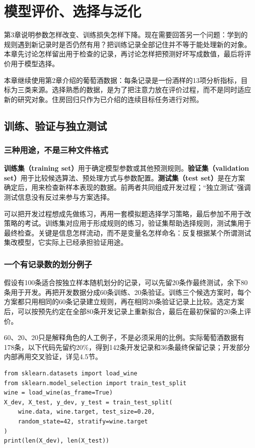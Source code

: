 \chapter{模型评价、选择与泛化}
\label{chap:evaluation}

第3章说明参数怎样改变、训练损失怎样下降。现在需要回答另一个问题：学到的规则遇到新记录时是否仍然有用？把训练记录全部记住并不等于能处理新的对象。本章先讨论怎样留出用于检查的记录，再讨论怎样把预测好坏写成数值，最后将评价用于模型选择。

本章继续使用第2章介绍的葡萄酒数据：每条记录是一份酒样的13项分析指标，目标为三类来源。选择熟悉的数据，是为了把注意力放在评价过程，而不是同时适应新的研究对象。住房回归只作为已介绍的连续目标任务进行对照。

\section{训练、验证与独立测试}
\subsection{三种用途，不是三种文件格式}
\textbf{训练集（training set）}用于确定模型参数或其他预测规则。\textbf{验证集（validation set）}用于比较候选算法、预处理方式与参数配置。\textbf{测试集（test set）}是在方案确定后，用来检查新样本表现的数据。前两者共同组成开发过程；“独立测试”强调测试信息没有反过来参与方案选择。

可以把开发过程想成先做练习，再用一套模拟题选择学习策略，最后参加不用于改策略的考试。训练集对应用于形成规则的练习，验证集帮助选择规则，测试集用于最终检查。关键是信息怎样流动，而不是变量名怎样命名：反复根据某个所谓测试集改模型，它实际上已经承担验证用途。

\subsection{一个有记录数的划分例子}
假设有100条适合按独立样本随机划分的记录，可以先留20条作最终测试，余下80条用于开发。再把开发数据分成60条训练、20条验证。训练三个候选方案时，每个方案都只用相同的60条记录建立规则，再在相同20条验证记录上比较。选定方案后，可以按预先约定在全部80条开发记录上重新拟合，最后在最初保留的20条上评价。

60、20、20只是解释角色的人工例子，不是必须采用的比例。实际葡萄酒数据有178条，以下代码先留约20\%，得到142条开发记录和36条最终保留记录；开发部分内部再用交叉验证，详见4.5节。
\begin{lstlisting}[caption={建立后续章节共用的开发与保留划分}]
from sklearn.datasets import load_wine
from sklearn.model_selection import train_test_split
wine = load_wine(as_frame=True)
X_dev, X_test, y_dev, y_test = train_test_split(
    wine.data, wine.target, test_size=0.20,
    random_state=42, stratify=wine.target
)
print(len(X_dev), len(X_test))
\end{lstlisting}

